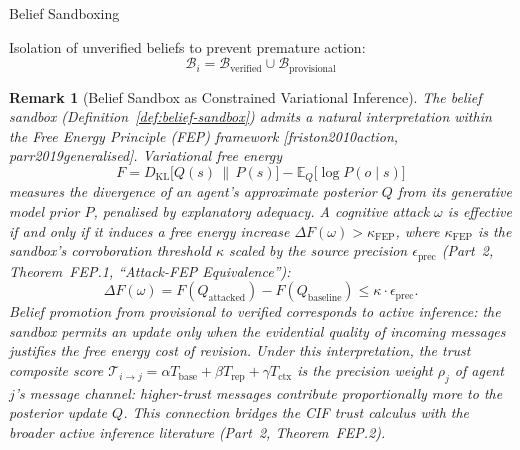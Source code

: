 \documentclass[
  ignorenonframetext,
]{beamer}
\providecommand{\citep}[1]{[#1]}
\newtheorem{remark}[theorem]{Remark}
\begin{document}
\begin{frame}[allowframebreaks]{Belief Sandboxing}
\protect{}\label{belief-sandboxing}
\begin{definition}
\label{def:belief-sandbox}
Isolation of unverified beliefs to prevent premature action:
\begin{equation}
\label{eq:sandbox-partition-defense}
\mathcal{B}_i = \mathcal{B}_{\text{verified}} \cup \mathcal{B}_{\text{provisional}}
\end{equation}
\end{definition}

\begin{remark}[Belief Sandbox as Constrained Variational Inference]
\label{rem:sandbox-fep}
The belief sandbox (Definition~\ref{def:belief-sandbox}) admits a natural
interpretation within the Free Energy Principle (FEP) framework
\citep{friston2010action, parr2019generalised}. Variational free energy
\[
F = D_{\mathrm{KL}}\bigl[Q(s) \,\|\, P(s)\bigr] - \mathbb{E}_{Q}\bigl[\log P(o \mid s)\bigr]
\]
measures the divergence of an agent's approximate posterior $Q$ from its
generative model prior $P$, penalised by explanatory adequacy.
A cognitive attack $\omega$ is effective if and only if it induces a free energy
increase $\Delta F(\omega) > \kappa_{\mathrm{FEP}}$, where $\kappa_{\mathrm{FEP}}$
is the sandbox's corroboration threshold $\kappa$ scaled by the source
precision $\epsilon_{\text{prec}}$ (Part~2, Theorem~FEP.1, ``Attack-FEP Equivalence''):
\[
\Delta F(\omega) = F\!\left(Q_{\text{attacked}}\right) - F\!\left(Q_{\text{baseline}}\right)
\leq \kappa \cdot \epsilon_{\text{prec}}.
\]
Belief promotion from provisional to verified corresponds to \emph{active
inference}: the sandbox permits an update only when the evidential
quality of incoming messages justifies the free energy cost of revision.
Under this interpretation, the trust composite score
$\mathcal{T}_{i\to j} = \alpha T_{\text{base}} + \beta T_{\text{rep}} + \gamma T_{\text{ctx}}$
is the \emph{precision weight} $\rho_j$ of agent $j$'s message channel:
higher-trust messages contribute proportionally more to the posterior
update $Q$.  This connection bridges the CIF trust calculus with the
broader active inference literature (Part~2, Theorem~FEP.2).
\end{remark}

\end{frame}
\end{document}
